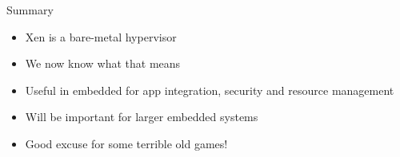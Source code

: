 \documentclass[xelatex]{beamer}
\begin{document}
\begin{frame}{Summary}
\begin{itemize}
\item Xen is a bare-metal hypervisor
\item We now know what that means
\item Useful in embedded for app integration, security and resource management
\item Will be important for larger embedded systems
\item Good excuse for some terrible old games!
\end{itemize}
\end{frame}
\end{document}

